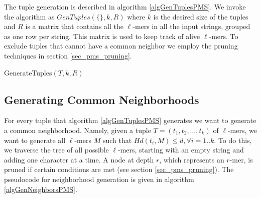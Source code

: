 The tuple generation is described in
algorithm \ref{algGenTuplesPMS}. We invoke the algorithm as $GenTuples(\{\},
k, R)$ where $k$ is the desired size of the tuples and $R$ is a matrix
that contains all the $\ell$-mers in all the input strings, grouped as one row
per string. This matrix is used to keep track of alive $\ell$-mers. To
exclude tuples that cannot have a common neighbor we employ
the pruning techniques in section \ref{sec_pms_pruning}.



\begin{algorithm}

\caption{GenerateTuples$(T,k,R)$} \label{algGenTuplesPMS}
 
\end{algorithm}


\subsection{Generating Common Neighborhoods}

For every tuple that algorithm \ref{algGenTuplesPMS} generates we want to
generate a common neighborhood. Namely, given a tuple $T=(t_1,
t_2, \ldots, t_k)$ of $\ell$-mers, we want to generate all $\ell$-mers $M$ such
that $Hd(t_i, M) \leq d, \forall i=1..k$. To do this, we traverse the tree of
all possible $\ell$-mers, starting with an empty string and adding one
character at a time. A node at depth $r$, which represents an $r$-mer, is
pruned if certain conditions are met (see section
\ref{sec_pms_pruning}). The pseudocode for neighborhood generation is given in
algorithm \ref{algGenNeighborsPMS}.

